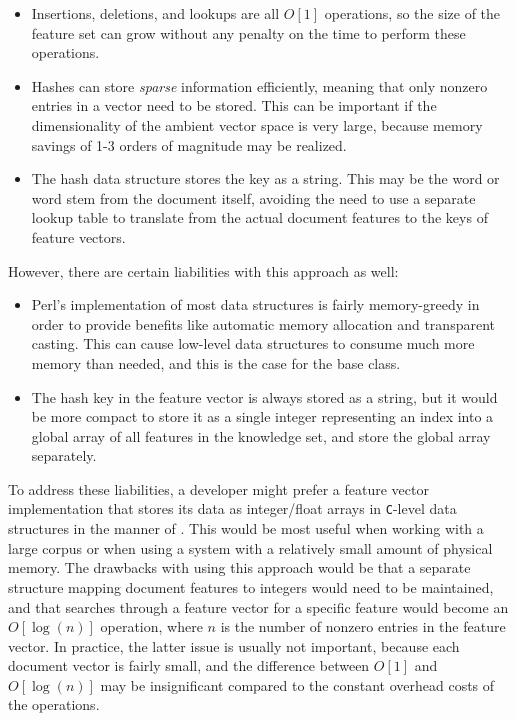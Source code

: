 \begin{itemize}
\item Insertions, deletions, and lookups are all $O[1]$
  operations, so the size of the feature set can grow without any
  penalty on the time to perform these operations.
\item Hashes can store \emph{sparse} information efficiently, meaning
  that only nonzero entries in a vector need to be stored.  This can
  be important if the dimensionality of the ambient vector space is
  very large, because memory savings of 1-3 orders of magnitude may be
  realized.
\item The hash data structure stores the key as a string.  This may be
  the word or word stem from the document itself, avoiding the need to
  use a separate lookup table to translate from the actual document
  features to the keys of feature vectors.
\end{itemize}

However, there are certain liabilities with this approach as well:

\begin{itemize}
\item Perl's implementation of most data structures is fairly
  memory-greedy in order to provide benefits like automatic memory
  allocation and transparent casting.  This can cause low-level data
  structures to consume much more memory than needed, and this is the
  case for the base  class.
\item The hash key in the feature vector is always stored as a string,
  but it would be more compact to store it as a single integer
  representing an index into a global array of all features in the
  knowledge set, and store the global array separately.
\end{itemize}

To address these liabilities, a developer might prefer a feature
vector implementation that stores its data as integer/float arrays in
\texttt{C}-level data structures in the manner of \cite{platt:99}.
This would be most useful when working with a large corpus or when
using a system with a relatively small amount of physical memory.  The
drawbacks with using this approach would be that a separate structure
mapping document features to integers would need to be maintained, and
that searches through a feature vector for a specific feature would
become an $O[\log(n)]$ operation, where $n$ is the number of nonzero
entries in the feature vector.  In practice, the latter issue is
usually not important, because each document vector is fairly small,
and the difference between $O[1]$ and $O[\log(n)]$ may be
insignificant compared to the constant overhead costs of the
operations.

